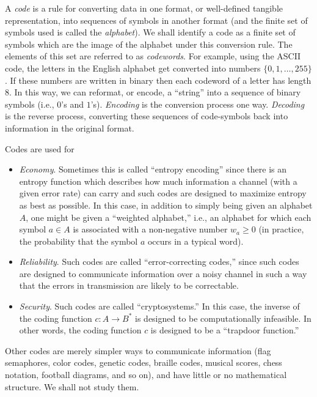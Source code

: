 A {\it code} is a rule for converting data in one
format, or well-defined tangible representation,
into sequences of symbols in another format (and the finite set of symbols
used is called the {\it alphabet}). We shall identify a code
as a finite set of symbols which are the image
of the alphabet under this conversion rule. The elements of this set
are referred to as {\it codewords}. For example, using the ASCII code,
the letters in the English alphabet get converted into numbers
$\{0, 1, \dots, 255\}$. If these numbers are written in binary
then each codeword of a letter has length 8. In this way, we can
reformat, or encode, a ``string'' into a sequence of binary symbols (i.e.,
$0$'s and $1$'s).
{\it Encoding} is the conversion process one way.
{\it Decoding} is the reverse
process, converting these sequences of code-symbols back into information
in the original format.


Codes are used for

\begin{itemize}
\item
{\it Economy}. Sometimes this is called ``entropy encoding''
since there is an entropy function which describes how much information
a channel (with a given error rate) can carry and such
codes are designed to maximize entropy as best as possible.
In this case, in addition to simply being given an alphabet $A$, one
might be given a ``weighted alphabet,'' i.e., an alphabet for which each
symbol $a\in A$ is associated with a non-negative number
$w_a\geq 0$ (in practice, the probability that the
symbol $a$ occurs in a typical word).

\item
{\it Reliability}. Such codes are called ``error-correcting codes,''
since such codes are designed to communicate information
over a noisy channel in such a way that the errors in transmission are
likely to be correctable.

\item
{\it Security}. Such codes are called ``cryptosystems.''
In this case, the inverse of the coding function $c:A\to B^*$ is designed to be
computationally infeasible. In other words, the coding function
$c$ is designed to be a ``trapdoor function.''

\end{itemize}

Other codes are merely simpler ways to communicate information
(flag semaphores, color codes, genetic codes, braille codes, musical scores, chess
notation, football diagrams, and so on), and have little or no
mathematical structure. We shall not study them.



